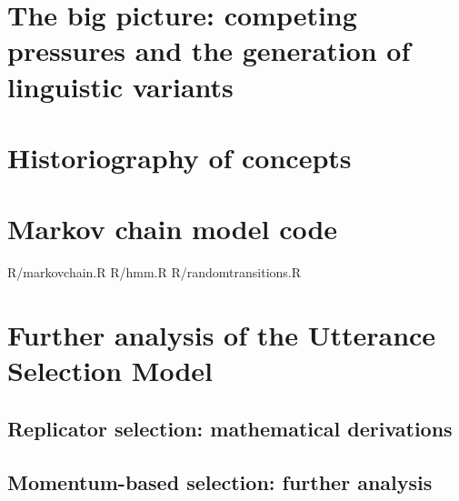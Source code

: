 \documentclass[oneside]{book}
\newcommand{\includeR}[1]{#1}
\begin{document}
\chapter[Competing pressures of variation and selection]{The big picture: competing pressures and the generation of linguistic variants}
\label{ch:bigpicture}


%



\printindex

\appendix
\chapter{Historiography of concepts}
\label{app:concepts}
%

\chapter{Markov chain model code}
\label{app:markovmodel}
\includeR{R/markovchain.R}
\includeR{R/hmm.R}
\includeR{R/randomtransitions.R}

\chapter[Further analysis of the USM]{Further analysis of the Utterance Selection Model}
\label{app:math}

\section{Replicator selection: mathematical derivations}
\label{app:usm}
%

\section{Momentum-based selection: further analysis}
\label{app:momentum}
%
\end{document}
